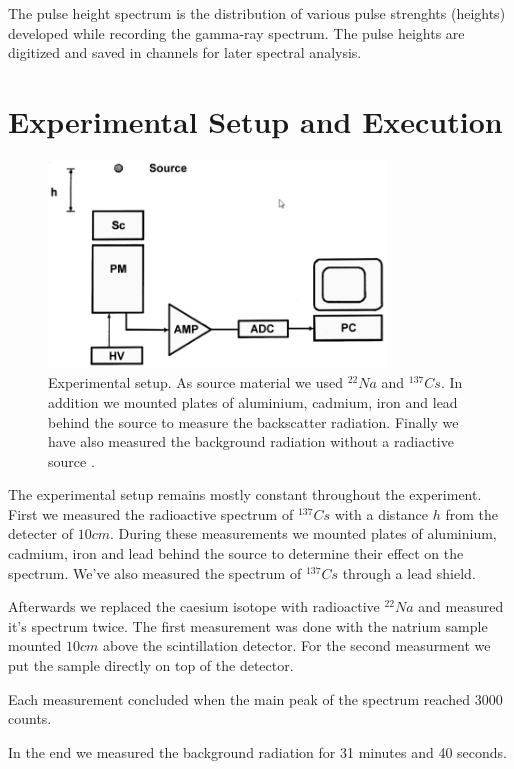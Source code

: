 \documentclass[bigchapter,colorback,accentcolor=tud4b,linedtoc,11pt]{tudreport}
\begin{document}
The pulse height spectrum is the distribution of various pulse strenghts (heights) developed while recording the gamma-ray spectrum. The pulse heights are digitized and saved in channels for later spectral analysis.

\chapter{Experimental Setup and Execution}
\begin{figure}[H] 
  \centering
     \includegraphics[width=0.8\textwidth]{img/aufbau.png}
     \caption{Experimental setup. As source material we used $^{22}Na$ and
       $^{137}Cs$. In addition we mounted plates of aluminium, cadmium, iron and
     lead behind the source to measure the backscatter radiation. Finally we have
     also measured the background radiation without a radiactive source \cite{Anleitung}.}
  \label{fig:aufbau}
\end{figure}

The experimental setup remains mostly constant throughout the experiment. First
we measured the radioactive spectrum of $^{137}Cs$ with a distance $h$ from the
detecter of $10 cm$. During these measurements
we mounted plates of aluminium, cadmium, iron and lead behind the source to
determine their effect on the spectrum. We've also measured the spectrum of
$^{137}Cs$ through a lead shield.

Afterwards we replaced the caesium isotope with radioactive $^{22}Na$ and
measured it's spectrum twice. The first measurement was done with the natrium
sample mounted $10 cm$ above the scintillation detector. For the second
measurment we put the sample directly on top of the detector.

Each measurement concluded when the main peak of the spectrum reached $3000$ counts.

In the end we measured the background radiation for 31 minutes and 40 seconds.
\end{document}
